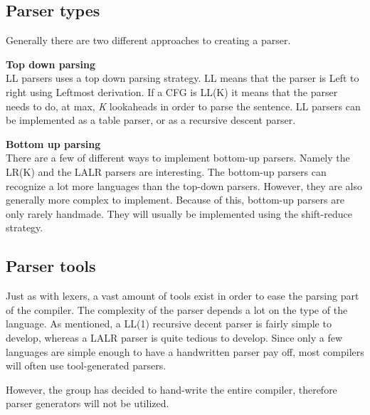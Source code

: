 \subsection{Parser types}
Generally there are two different approaches to creating a parser.

\textbf{Top down parsing}\\
LL parsers uses a top down parsing strategy. 
LL means that the parser is Left to right using Leftmost derivation. 
If a CFG is LL(K) it means that the parser needs to do, at max, \textit{K} lookaheads in order to parse the sentence. 
LL parsers can be implemented as a table parser, or as a recursive descent parser. 

\textbf{Bottom up parsing}\\
There are a few of different ways to implement bottom-up parsers. 
Namely the LR(K) and the LALR parsers are interesting. 
The bottom-up parsers can recognize a lot more languages than the top-down parsers.
However, they are also generally more complex to implement.
Because of this, bottom-up parsers are only rarely handmade.
They will usually be implemented using the shift-reduce strategy.

\subsection{Parser tools}
Just as with lexers, a vast amount of tools exist in order to ease the parsing part of the compiler. 
The complexity of the parser depends a lot on the type of the language. 
As mentioned, a LL(1) recursive decent parser is fairly simple to develop, whereas a LALR parser is quite tedious to develop. 
Since only a few languages are simple enough to have a handwritten parser pay off, most compilers will often use tool-generated parsers.

However, the group has decided to hand-write the entire compiler, therefore parser generators will not be utilized.
